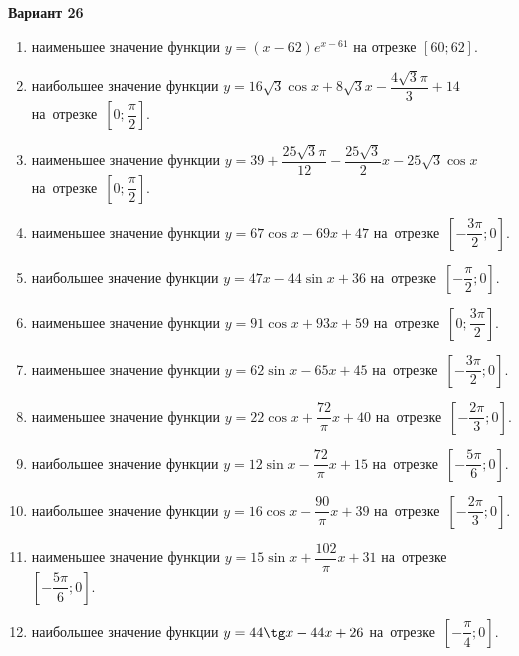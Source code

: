 \documentclass[a4paper,10pt]{article}
\begin{document}
\begin{center}\Large\textbf{Вариант 26}\end{center}

\begin{enumerate}
\item {} наименьшее значение функции $y = \left(x-62\right)e^{x-61}$ на отрезке $\left[60;62\right]$.

\item {} наибольшее значение функции $y = 16\sqrt{3}\cos x+8\sqrt{3}x-\dfrac{4\sqrt{3}\pi}{3} +14$ на~отрезке~$\left[0;\dfrac{\pi }{2}\right]$.

\item {} наименьшее значение функции $y = 39+\dfrac{25\sqrt{3} \pi}{12}-\dfrac{25\sqrt{3}}{2}x-25\sqrt{3}\cos x$ на~отрезке~$\left[0;\dfrac{\pi }{2}\right]$.

\item {} наименьшее значение функции $y = 67\cos x-69x+47$ на~отрезке~$\left[-\dfrac{3\pi }{2};0\right]$.

\item {} наибольшее значение функции $y = 47x-44\sin x+36$ на~отрезке~$\left[-\dfrac{\pi }{2};0\right]$.

\item {} наименьшее значение функции $y = 91\cos x+93x+59$ на~отрезке~$\left[0;\dfrac{3\pi }{2}\right]$.

\item {} наименьшее значение функции $y = 62\sin x-65x+45$ на~отрезке~$\left[-\dfrac{3\pi }{2};0\right]$.

\item {} наименьшее значение функции $y = 22\cos x+\dfrac{72}{\pi }x +40$ на~отрезке~$\left[-\dfrac{2\pi }{3};0\right]$.

\item {} наибольшее значение функции $y = 12\sin x-\dfrac{72}{\pi }x+15$ на~отрезке~$\left[-\dfrac{5\pi }{6};0\right]$.

\item {} наибольшее значение функции $y = 16\cos x-\dfrac{90}{\pi }x+39$ на~отрезке~$\left[-\dfrac{2\pi }{3};0\right]$.

\item {} наименьшее значение функции $y = 15\sin x+\dfrac{102}{\pi }x+31$ на~отрезке~$\left[-\dfrac{5\pi }{6};0\right]$.

\item {} наибольшее значение функции $y = 44\tg x-44x+26$ на~отрезке~$\left[-\dfrac{\pi }{4};0\right]$.


\end{enumerate}
\end{document}
